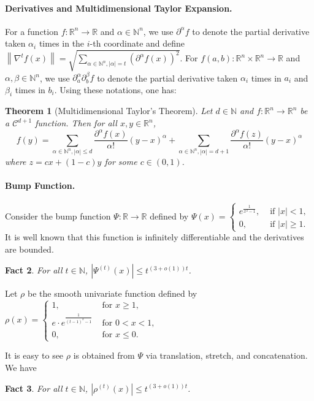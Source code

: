 \documentclass[12pt]{article}
\newtheorem{theorem}{Theorem}[section]
\newtheorem{fact}[theorem]{Fact}
\newcommand{\N}{\mathbb{N}}  \newcommand{\R}{\mathbb{R}} \newcommand{\C}{\mathbb{C}} \newcommand{\U}{\mathbb{U}} \renewcommand{\d}{\mathrm{d}} \DeclareMathOperator*{\E}{\mathbb{E}}  \newcommand{\so}{\mathrm{SO}} \newcommand{\s}{\mathrm{S}} \newcommand{\su}{\mathrm{SU}} \renewcommand{\i}{\mathrm{i}} \newcommand{\A}{\mathcal{A}}  \newcommand{\B}{\mathcal{B}} \newcommand{\CC}{\mathcal{C}} \newcommand{\D}{\mathcal{D}} \newcommand{\F}{\mathcal{F}} \renewcommand{\H}{\mathcal{H}} \newcommand{\K}{\mathcal{K}} \newcommand{\NN}{\mathcal{N}} \newcommand{\V}{\mathcal{V}} \newcommand{\X}{\mathcal{X}} \newcommand{\Y}{\mathcal{Y}} \renewcommand{\S}{\mathcal{S}} \newcommand{\SR}{\mathcal{S}_{\R}} \newcommand{\SC}{\mathcal{S}_{\C}} \newcommand{\EE}{\mathcal{E}}  \newcommand{\PP}{\mathcal{P}} \newcommand{\KK}{\widetilde{K}} \newcommand{\LL}{\widetilde{L}} \newcommand{\W}{\widehat{W}} \newcommand{\f}{\hat{f}} \newcommand{\g}{\hat{g}} \newcommand{\h}{\hat{h}} \newcommand{\bit}[1]{\{0,1\}^{#1}} \newcommand{\wrt}{w.r.t.~} \newcommand{\us}{\overset{\$}{\leftarrow}} \newcommand{\set}[1]{\left\{#1\right\}} \newcommand{\lhs}{\mathrm{LHS}} \newcommand{\expec}[1]{\E\!\Br{#1}} \newcommand{\expect}[2]{\E_{\substack{#1}}\!\Br{#2}} \newcommand{\prob}[2]{\underset{#1}{\mathrm{Pr}}\!\Br{#2}} \newcommand{\cf}{\widetilde{f}} \newcommand{\cg}{\widetilde{g}} \newcommand{\ch}{\widetilde{h}} \newcommand{\ck}{\widetilde{K}} \newcommand{\rep}[2]{\br{#1}_{#2}} \newcommand{\AND}[1]{\mathrm{AND}\!\br{#1}}
\newcommand{\grad}[2]{\nabla^{#1}{#2}}
\newcommand{\br}[1]{\left(#1\right)} \newcommand{\Br}[1]{\left[#1\right]} \newcommand{\st}[1]{\left\{#1\right\}} \newcommand{\tr}[1]{\mathrm{Tr}\!\Br{#1}} \newcommand{\abs}[1]{\left|#1 \right|} \newcommand{\norm}[1]{\left\lVert #1 \right\rVert} \newcommand{\agl}[2]{\theta^{\br{#1}}_{#2}} \newcommand{\aglp}[2]{{\theta'}^{\br{#1}}_{#2}} \newcommand{\lint}[1]{\left\lfloor#1\right\rfloor} \newcommand{\poly}[1]{\mathrm{poly}\!\br{#1}} \newcommand{\negl}[1]{\mathrm{negl}\!\br{#1}} \newcommand{\de}[1]{\mathrm{d}#1} \newcommand{\val}[1]{\mathrm{val}\!\br{#1}} \newcommand{\vall}[1]{\mathrm{val}\br{#1}} \newcommand{\nd}[1]{\mathcal{N}\!\br{#1}} \newcommand{\ketbratwo}[2]{\ket{#1} \hspace{-0.4em}\bra{#2}} \newcommand{\ketbra}[1]{\ketbratwo{#1}{#1}} \newcommand{\id}{\ensuremath{\mathds{1}}} \newcommand{\ogroup}[1]{\mathrm{O}\!\br{#1}} \newcommand{\ugroup}[1]{\mathrm{U}\!\br{#1}} \newcommand{\td}{\mathrm{TD}} \newcommand{\tv}[1]{\norm{#1}_{\mathrm{TV}}} \newcommand {\defeq} {\ensuremath{ \stackrel{\mathrm{def}}{=} }} \newcommand{\vdim}{\ensuremath{N}} \newcommand{\dimin}{\ensuremath{n}} \newcommand{\dimout}{\ensuremath{m}} \newcommand{\ncopy}{\ell} \newcommand{\hspacein}{\H_\mathrm{in}} \newcommand{\hspaceout}{\H_\mathrm{out}} \newcommand{\Sin}{\S(\hspacein)} \newcommand{\Sout}{\S(\hspaceout)} \newcommand{\haar}{\ensuremath{\mu}} \newcommand{\tensorhaar}{\ensuremath{\eta}} \newcommand{\tensorsrss}{\ensuremath{\nu}} \newcommand{\qadvice}{\ensuremath{\rho}} \newcommand{\tp}{\otimes} \newcommand{\wone}[2]{W_1\!\br{#1,#2}}
\begin{document}
\paragraph{Derivatives and Multidimensional Taylor Expansion.}
For a function $f:\R^n \to \R$ and $\alpha\in \N^n$, we use $\partial^{\alpha}\!f$ to denote the partial derivative taken $\alpha_i$ times in the $i$-th coordinate and define $\norm{\grad{t}{f(x)}} = \sqrt{\sum_{\alpha\in\N^n, \abs{\alpha}=t} \br{\partial^{\alpha} f(x)}^2}$.
For $f(a,b): \R^n \times \R^n \to \R$ and $\alpha,\beta\in \N^n$, we use $\partial^{\alpha}_a\partial^{\beta}_b\!f$ to denote the partial derivative taken $\alpha_i$ times in $a_i$ and $\beta_i$ times in $b_i$.
Using these notations, one has:
\begin{theorem}[Multidimensional Taylor's Theorem]\label{thm:taylor}
	Let $d\in \N$ and $f:\R^n \to \R^n$ be a $\mathcal{C}^{d+1}$ function.
	Then for all $x,y\in\R^n$,
	\[
		f(y) = \sum_{\alpha\in\N^n, \abs{\alpha}\leq d}	\frac{\partial^{\alpha} f(x)}{\alpha!} (y-x)^{\alpha} + \sum_{\alpha\in\N^n, \abs{\alpha}= d+1}	\frac{\partial^{\alpha} f(z)}{\alpha!} (y-x)^{\alpha}
	\]
	where $z = cx+(1-c)y$ for some $c\in(0,1)$.
\end{theorem}

\vspace{-1em}
\paragraph{Bump Function.}
Consider the bump function $\Psi:\R\to\R$ defined by
$
	\Psi(x) = \begin{cases}
		e^{\frac{1}{x^2-1}}, &\text{ if } \abs{x}<1,\\
		0, &\text{ if } \abs{x}\geq 1.
	\end{cases}
$
It is well known that this function is infinitely differentiable and the derivatives are bounded.
\begin{fact}\label{fact:deri1}
	For all $t\in \N$, $\abs{\Psi^{(t)}(x) } \leq t^{(3+o(1))t}$.
\end{fact}
\noindent Let $\rho$ be the smooth univariate function defined by
$
	\rho(x) = \begin{cases}
		1, &\text{ for }x\geq 1,\\
		e\cdot e^{\frac{1}{(t-1)^2-1}} &\text{ for } 0<x<1,\\
		0, &\text{ for }x\leq 0.
	\end{cases}
$

\noindent It is easy to see $\rho$ is obtained from $\Psi$ via translation, stretch, and concatenation.
We have
\begin{fact}\label{fact:deri2}
	For all $t\in \N$, $\abs{\rho^{(t)}(x)} \leq t^{(3+o(1))t}$.
\end{fact}
\end{document}
